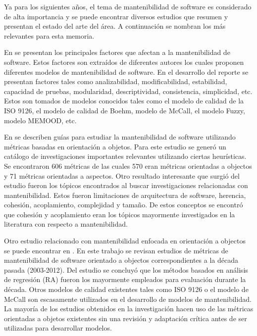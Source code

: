 Ya para los siguientes años, el tema de mantenibilidad de software es considerado
de alta importancia y se puede encontrar diversos estudios que resumen y presentan
el estado del arte del área. A continuación se nombran los más relevantes
para esta memoria.

En \cite{survey} se presentan los principales factores que afectan a la mantenibilidad de
software. Estos factores son extraídos de diferentes autores los cuales 
proponen diferentes modelos de mantenibilidad de software.
En el desarrollo del reporte se presentan factores tales como 
analizabilidad, modificabilidad, estabilidad, capacidad de pruebas, modularidad,
descriptividad, consistencia, simplicidad, etc. Estos son tomados de modelos
conocidos tales como el modelo de calidad de la ISO 9126, el modelo de calidad
de Boehm, modelo de McCall, el modelo Fuzzy, modelo MEMOOD, etc.

En \cite{roadmap} se describen guías para estudiar la mantenibilidad de software
utilizando métricas basadas en orientación a objetos. Para este estudio
se generó un catálogo de investigaciones importantes relevantes utilizando
ciertas heurísticas. Se encontraron 606 métricas de las cuales 570 eran métricas
orientadas a objectos y 71 métricas orientadas a aspectos. Otro resultado
interesante que surgió del estudio fueron los tópicos encontrados al buscar
investigaciones relacionadas con mantenibilidad. Estos fueron limitaciones
de arquitectura de software, herencia, cohesión, acoplamiento, complejidad
y tamaño. De estos conceptos se encontró que cohesión y acoplamiento eran
los tópicos mayormente investigados en la literatura con respecto a mantenibilidad.

Otro estudio relacionado con mantenibilidad enfocada en orientación a objectos
se puede encontrar en \cite{pastDecade}. En este trabajo se revisan estudios
de métricas de mantenibilidad de software orientado a objectos correspondientes
a la década pasada (2003-2012). Del estudio se concluyó que los métodos
basados en análisis de regresión (RA) fueron los mayormente empleados para
evaluación durante la década. Otros modelos de calidad existentes tales como
ISO 9126 o el modelo de McCall son escasamente utilizados en el desarrollo
de modelos de mantenibilidad. La mayoría de los estudios obtenidos en la investigación
hacen uso de las métricas orientadas a objetos existentes sin una revisión
y adaptación crítica antes de ser utilizadas para desarrollar modelos.


